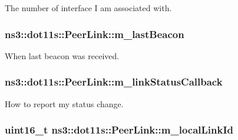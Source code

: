 The number of interface I am associated with. 

\subsubsection[{\texorpdfstring{m\+\_\+last\+Beacon}{m_lastBeacon}}]{ ns3\+::dot11s\+::\+Peer\+Link\+::m\+\_\+last\+Beacon\hspace{0.3cm}{\ttfamily [private]}}\hypertarget{classns3_1_1dot11s_1_1PeerLink_a025e3907d1183e71a14698bea36cf0b0}{}\label{classns3_1_1dot11s_1_1PeerLink_a025e3907d1183e71a14698bea36cf0b0}


When last beacon was received. 

\subsubsection[{\texorpdfstring{m\+\_\+link\+Status\+Callback}{m_linkStatusCallback}}]{ ns3\+::dot11s\+::\+Peer\+Link\+::m\+\_\+link\+Status\+Callback\hspace{0.3cm}{\ttfamily [private]}}\hypertarget{classns3_1_1dot11s_1_1PeerLink_aa3cadbb1c5ea5b1b70bf0e4d0bf1dcdd}{}\label{classns3_1_1dot11s_1_1PeerLink_aa3cadbb1c5ea5b1b70bf0e4d0bf1dcdd}


How to report my status change. 

\subsubsection[{\texorpdfstring{m\+\_\+local\+Link\+Id}{m_localLinkId}}]{\setlength{\rightskip}{0pt plus 5cm}uint16\+\_\+t ns3\+::dot11s\+::\+Peer\+Link\+::m\+\_\+local\+Link\+Id\hspace{0.3cm}{\ttfamily [private]}}\hypertarget{classns3_1_1dot11s_1_1PeerLink_ae0647b7f17be8e5f3f721cf4c714ab81}{}\label{classns3_1_1dot11s_1_1PeerLink_ae0647b7f17be8e5f3f721cf4c714ab81}



